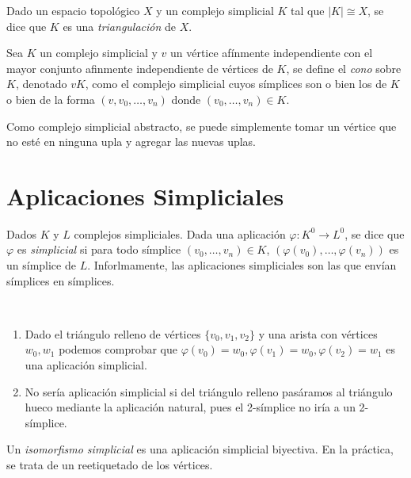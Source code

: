 \documentclass[HS.tex]{subfiles}
\begin{document}
\begin{defi}
Dado un espacio topológico $X$ y un complejo simplicial $K$ tal que $|K|\cong X$, se dice que $K$ es una \emph{triangulación} de $X$. 
\end{defi}

\begin{defi}
Sea $K$ un complejo simplicial y $v$ un vértice afínmente independiente con el mayor conjunto afinmente independiente de vértices de $K$, se define el \emph{cono} sobre $K$, denotado $vK$,  como el complejo simplicial cuyos símplices son o bien los de $K$ o bien de la forma $(v,v_0,\dots, v_n)$ donde $(v_0,\dots, v_n)\in K$. 
\end{defi}

\begin{nota}
Como complejo simplicial abstracto, se puede simplemente tomar un vértice que no esté en ninguna upla y agregar las nuevas uplas.
\end{nota}

\section{Aplicaciones Simpliciales}

\begin{defi}
Dados $K$ y $L$ complejos simpliciales. Dada una aplicación $\varphi:K^0\to L^0$, se dice que $\varphi$ es \emph{simplicial} si para todo símplice $(v_0,\dots, v_n)\in K$, $(\varphi(v_0),\dots, \varphi(v_n))$ es un símplice de $L$. Inforlmamente, las aplicaciones simpliciales son las que envían símplices en símplices.
\end{defi}

\begin{ej}\
\begin{enumerate}
\item Dado el triángulo relleno de vértices $\{v_0,v_1,v_2\}$ y una arista con vértices $w_0,w_1$ podemos comprobar que $\varphi(v_0)=w_0, \varphi(v_1)=w_0,\varphi(v_2)=w_1$ es una aplicación simplicial. 

\item No sería aplicación simplicial si del triángulo relleno pasáramos al triángulo hueco mediante la aplicación natural, pues el 2-símplice no iría a un 2-símplice. 
\end{enumerate}
\end{ej}

\begin{defi}
Un \emph{isomorfismo simplicial} es una aplicación simplicial biyectiva. En la práctica, se trata de un reetiquetado de los vértices.
\end{defi}
\end{document}

